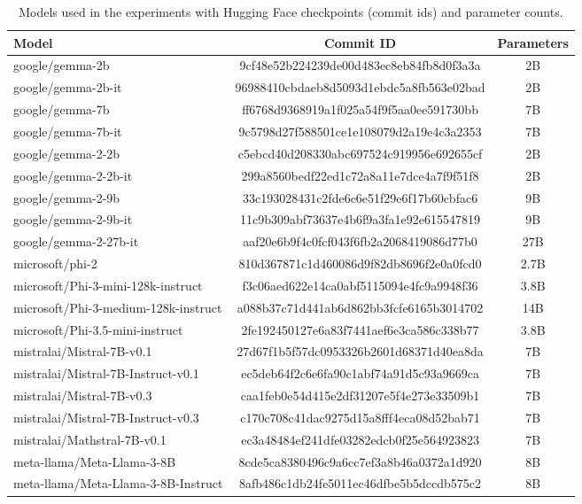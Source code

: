 \documentclass[11pt]{article}
\begin{document}
\begin{table}[t]
\small
\centering
\begin{tabular}{lcc}
\toprule
Model & Commit ID & Parameters \\
\midrule
google/gemma-2b & 9cf48e52b224239de00d483ec8eb84fb8d0f3a3a & 2B \\
google/gemma-2b-it & 96988410cbdaeb8d5093d1ebdc5a8fb563e02bad & 2B \\
google/gemma-7b & ff6768d9368919a1f025a54f9f5aa0ee591730bb & 7B \\
google/gemma-7b-it & 9c5798d27f588501ce1e108079d2a19e4c3a2353 & 7B \\
google/gemma-2-2b & c5ebcd40d208330abc697524c919956e692655cf & 2B \\
google/gemma-2-2b-it & 299a8560bedf22ed1c72a8a11e7dce4a7f9f51f8 & 2B \\
google/gemma-2-9b & 33c193028431c2fde6c6e51f29e6f17b60cbfac6 & 9B \\
google/gemma-2-9b-it & 11c9b309abf73637e4b6f9a3fa1e92e615547819 & 9B \\
google/gemma-2-27b-it & aaf20e6b9f4c0fcf043f6fb2a2068419086d77b0 & 27B \\
microsoft/phi-2 & 810d367871c1d460086d9f82db8696f2e0a0fcd0 & 2.7B \\
microsoft/Phi-3-mini-128k-instruct & f3c06aed622e14ca0abf5115094e4fc9a9948f36 & 3.8B \\
microsoft/Phi-3-medium-128k-instruct & a088b37c71d441ab6d862bb3fcfe6165b3014702 & 14B \\
microsoft/Phi-3.5-mini-instruct & 2fe192450127e6a83f7441aef6e3ca586c338b77 & 3.8B \\
mistralai/Mistral-7B-v0.1 & 27d67f1b5f57dc0953326b2601d68371d40ea8da & 7B \\
mistralai/Mistral-7B-Instruct-v0.1 & ec5deb64f2c6e6fa90c1abf74a91d5c93a9669ca & 7B \\
mistralai/Mistral-7B-v0.3 & caa1feb0e54d415e2df31207e5f4e273e33509b1 & 7B \\
mistralai/Mistral-7B-Instruct-v0.3 & c170c708c41dac9275d15a8fff4eca08d52bab71 & 7B \\
mistralai/Mathstral-7B-v0.1 & ec3a48484ef241dfe03282edcb0f25e564923823 & 7B \\
meta-llama/Meta-Llama-3-8B & 8cde5ca8380496c9a6cc7ef3a8b46a0372a1d920 & 8B \\
meta-llama/Meta-Llama-3-8B-Instruct & 8afb486c1db24fe5011ec46dfbe5b5dccdb575c2 & 8B \\
\bottomrule
\end{tabular}
\caption{Models used in the experiments with Hugging Face checkpoints (commit ids) and parameter counts.}
\label{tab:models}
\end{table}
\end{document}
